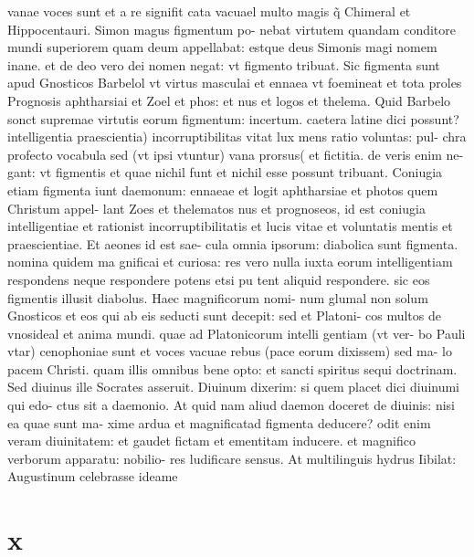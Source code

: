 \documentclass{article}
\begin{document}
\begin{pages}
vanae voces sunt et a re signifit cata vacuael multo magis q̃ Chimeral et Hippocentauri. Simon magus figmentum po- nebat virtutem quandam conditore mundi superiorem quam deum appellabat: estque  deus Simonis magi nomem inane. et de deo vero dei nomen negat: vt figmento tribuat. Sic figmenta sunt apud Gnosticos Barbelol vt virtus masculai et ennaea vt foemineat et tota proles Prognosis aphtharsiai et Zoel et phos: et nus et logos et thelema. Quid Barbelo sonct supremae virtutis eorum figmentum: incertum. caetera latine dici possunt? intelligentia praescientia) incorruptibilitas vitat lux mens ratio voluntas: pul- chra profecto vocabula sed (vt ipsi vtuntur) vana prorsus( et fictitia. de veris enim ne- gant: vt figmentis et quae nichil funt et nichil esse possunt tribuant. Coniugia etiam figmenta iunt daemonum: ennaeae et logit aphtharsiae et photos quem Christum appel- lant Zoes et thelematos nus et prognoseos, id est coniugia intelligentiae et rationist incorruptibilitatis et lucis vitae et voluntatis mentis et praescientiae. Et aeones id est sae- cula omnia ipsorum: diabolica sunt figmenta. nomina quidem ma gnificai et curiosa: res vero nulla iuxta eorum intelligentiam respondens neque respondere potens etsi pu tent aliquid respondere. sic eos figmentis illusit diabolus. Haec magnificorum nomi- num glumal non solum Gnosticos et eos qui ab eis seducti sunt decepit: sed et Platoni- cos multos de vnosideal et anima mundi. quae ad Platonicorum intelli gentiam (vt ver- bo Pauli vtar) cenophoniae sunt et voces vacuae rebus (pace eorum dixissem) sed ma- lo pacem Christi. quam illis omnibus bene opto: et sancti spiritus sequi doctrinam. Sed diuinus ille Socrates asseruit. Diuinum dixerim: si quem placet dici diuinumi qui edo- ctus sit a daemonio. At quid nam aliud daemon doceret de diuinis: nisi ea quae sunt ma- xime ardua et magnificatad figmenta deducere? odit enim veram diuinitatem: et gaudet fictam et ementitam inducere. et magnifico verborum apparatu: nobilio- res ludificare sensus. At multilinguis hydrus Iibilat: Augustinum celebrasse ideame  \pend
\section*{x }

\end{pages}
\end{document}
